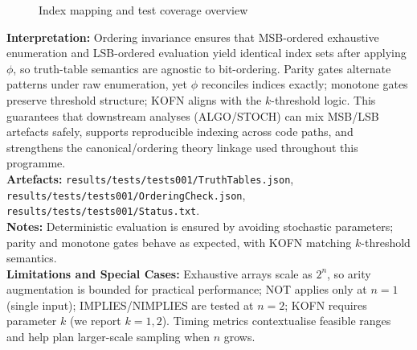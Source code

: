 \documentclass[11pt]{article}
\begin{document}
\begin{figure}[h]
\centering
{}
\caption{Index mapping and test coverage overview}
\end{figure}
\textbf{Interpretation:} Ordering invariance ensures that MSB-ordered exhaustive enumeration and LSB-ordered evaluation yield identical index sets after applying $\phi$, so truth-table semantics are agnostic to bit-ordering. Parity gates alternate patterns under raw enumeration, yet $\phi$ reconciles indices exactly; monotone gates preserve threshold structure; KOFN aligns with the $k$-threshold logic. This guarantees that downstream analyses (ALGO/STOCH) can mix MSB/LSB artefacts safely, supports reproducible indexing across code paths, and strengthens the canonical/ordering theory linkage used throughout this programme.\\
\textbf{Artefacts:} \texttt{results/tests/tests001/TruthTables.json}, \texttt{results/tests/tests001/OrderingCheck.json}, \texttt{results/tests/tests001/Status.txt}.\\
\textbf{Notes:} Deterministic evaluation is ensured by avoiding stochastic parameters; parity and monotone gates behave as expected, with KOFN matching $k$-threshold semantics.
\\
\textbf{Limitations and Special Cases:} Exhaustive arrays scale as $2^n$, so arity augmentation is bounded for practical performance; NOT applies only at $n=1$ (single input); IMPLIES/NIMPLIES are tested at $n=2$; KOFN requires parameter $k$ (we report $k=1,2$). Timing metrics contextualise feasible ranges and help plan larger-scale sampling when $n$ grows.
\end{document}
